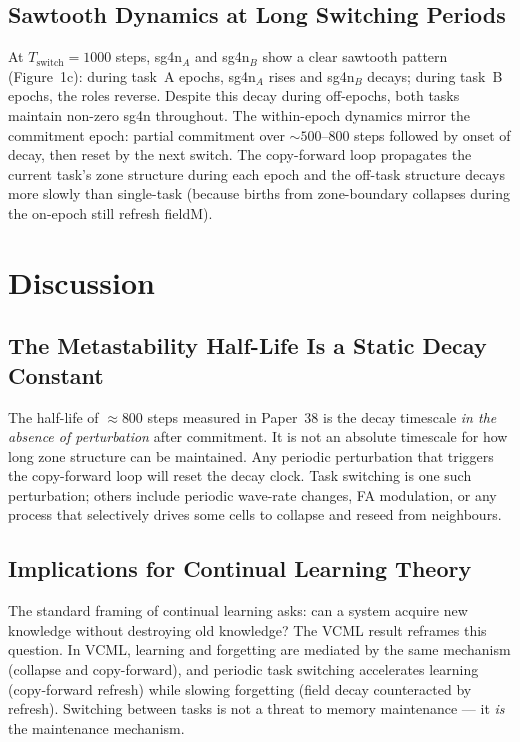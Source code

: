 \documentclass[11pt]{article}
\begin{document}
\subsection{Sawtooth Dynamics at Long Switching Periods}

At $T_\mathrm{switch} = 1000$ steps, sg4n$_A$ and sg4n$_B$ show a clear sawtooth
pattern (Figure~1c): during task~A epochs, sg4n$_A$ rises and sg4n$_B$ decays;
during task~B epochs, the roles reverse.
Despite this decay during off-epochs, both tasks maintain non-zero sg4n throughout.
The within-epoch dynamics mirror the commitment epoch: partial commitment over $\sim
500$--$800$ steps followed by onset of decay, then reset by the next switch.
The copy-forward loop propagates the current task's zone structure during each epoch
and the off-task structure decays more slowly than single-task (because births from
zone-boundary collapses during the on-epoch still refresh fieldM).

\section{Discussion}

\subsection{The Metastability Half-Life Is a Static Decay Constant}

The half-life of $\approx 800$ steps measured in Paper~38 is the decay timescale
\emph{in the absence of perturbation} after commitment.
It is not an absolute timescale for how long zone structure can be maintained.
Any periodic perturbation that triggers the copy-forward loop will reset the decay
clock.
Task switching is one such perturbation; others include periodic wave-rate changes,
FA modulation, or any process that selectively drives some cells to collapse and
reseed from neighbours.

\subsection{Implications for Continual Learning Theory}

The standard framing of continual learning asks: can a system acquire new knowledge
without destroying old knowledge?
The VCML result reframes this question.
In VCML, learning and forgetting are mediated by the same mechanism (collapse and
copy-forward), and periodic task switching accelerates learning (copy-forward refresh)
while slowing forgetting (field decay counteracted by refresh).
Switching between tasks is not a threat to memory maintenance --- it \emph{is} the
maintenance mechanism.
\end{document}
